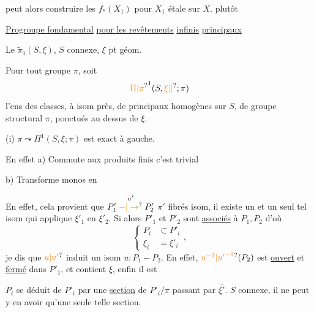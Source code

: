 peut alors  construire les $f_*(X_1)$ pour
$X_1$ étale sur $X$.  plutôt\unsure{)|:}



\uline{Progroupe fondamental}
\uline{pour les revêtements}
\uline{infinis} \uline{principaux}

Le $\widetilde{\pi}_1(S,\xi)$, $S$  connexe, $\xi$ pt géom.

Pour tout groupe $\pi$, soit
\[
\unsure{\Pi|\pi}^{1}(S,\unsure{\xi|\vert};\pi)
\]
l'ens des classes, à isom près, de   principaux
homogènes sur $S$, de groupe structural $\pi$,
ponctués au dessus de $\xi$.

(i) $\pi\leadsto\Pi^1(S,\xi;\pi)$ est exact à gauche.

En effet \quad a) Commute aux produits finis
c'est trivial

b) Transforme monos  en 

En effet, cela provient que  
 $P'_1\mathrel{\overset{u'}{\unsure{-|\to}}}P'_2$   $\pi'$ fibrés  isom,
il existe un et un seul tel isom
qui applique $\xi'_1$ en $\xi'_2$. Si alors
$P'_1$ et $P'_2$ sont \uline{associés} à $P_1,P_2$ d'où
\[
\left\{\begin{aligned}P_i&\subset P'_i\\ \xi_i&=\xi'_i\end{aligned}\right.,
\]
 je dis que $\unsure{u|u'}$ 
 induit un isom $u:P_1\mathrel{-}P_2$. En
effet, 
$\unsure{u^{-1}|{u'}^{-1}}(P_2)$ est \uline{ouvert} et \uline{fermé} dans
$P'_1$, et contient $\xi$, enfin il est 

 $P_i$ se déduit de $P'_i$ par une
\uline{section} de $P'_i/\pi$ passant par $\overline{\xi'}$. $S$ 
connexe, il ne peut y en avoir qu'une
seule telle section.

